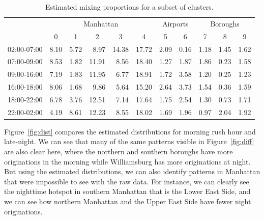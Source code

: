 \documentclass[12pt]{article}
\theoremstyle{definition}
\theoremstyle{algodesc}
\begin{document}
\begin{table}[htb] \centering
\begin{tabular}{rrrrrrrrrrr}
  \toprule
   & \multicolumn{5}{c}{Manhattan} & \multicolumn{2}{c}{Airports} & \multicolumn{3}{c}{Boroughs} \\
   \cmidrule(lr){2-6} \cmidrule(lr){7-8} \cmidrule(lr){9-11}
   & \multicolumn{1}{c}{0} & \multicolumn{1}{c}{1} & \multicolumn{1}{c}{2} & \multicolumn{1}{c}{3} & \multicolumn{1}{c}{4} & \multicolumn{1}{c}{5} & \multicolumn{1}{c}{6} & \multicolumn{1}{c}{7} & \multicolumn{1}{c}{8} & \multicolumn{1}{c}{9} \\
  \midrule
  02:00-07:00 &  8.10 &  5.72 &  8.97 & 14.38 & 17.72 &  2.09 &  0.16 &  1.18 &  1.45 &  1.62 \\
  07:00-09:00 &  8.53 &  1.82 & 11.91 &  8.56 & 18.40 &  1.27 &  1.87 &  1.86 &  0.23 &  1.58 \\
  09:00-16:00 &  7.19 &  1.83 & 11.95 &  6.77 & 18.91 &  1.72 &  3.58 &  1.20 &  0.25 &  1.23  \\
  16:00-18:00 &  8.06 &  1.68 &  9.86 &  5.64 & 15.20 &  2.64 &  3.73 &  1.54 &  0.36 &  1.59 \\
  18:00-22:00 &  6.78 &  3.76 & 12.51 &  7.14 & 17.64 &  1.75 &  2.54 &  1.30 &  0.73 &  1.71 \\
  22:00-02:00 &  4.19 &  8.61 & 12.23 &  8.55 & 18.02 &  1.69 &  1.96 &  0.97 &  2.04 &  1.92 \\
  \bottomrule
\end{tabular}
\caption{Estimated mixing proportions for a subset of clusters.}
\label{tab:mixing}
\end{table}

Figure~\ref{fig:dist} compares the estimated distributions for morning rush hour and late-night. We can see that many of the same patterns visible in Figure~\ref{fig:diff} are also clear here, where the northern and southern boroughs have more originations in the morning while Williamsburg has more originations at night. But using the estimated distributions, we can also identify patterns in Manhattan that were impossible to see with the raw data. For instance, we can clearly see the nighttime hotspot in southern Manhattan that is the Lower East Side, and we can see how northern Manhattan and the Upper East Side have fewer night originations.
\end{document}
